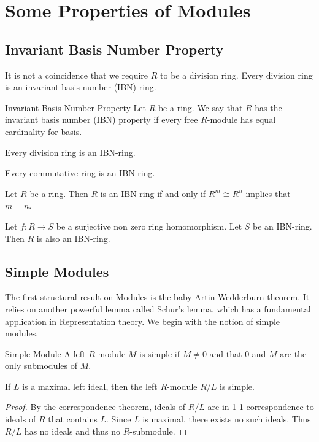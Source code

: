 \documentclass[a4paper]{article}
\begin{document}
\pagebreak
\section{Some Properties of Modules}
\subsection{Invariant Basis Number Property}
It is not a coincidence that we require $R$ to be a division ring. Every division ring is an invariant basis number (IBN) ring. 

\begin{defn}{Invariant Basis Number Property}{} Let $R$ be a ring. We say that $R$ has the invariant basis number (IBN) property if every free $R$-module has equal cardinality for basis. 
\end{defn}

\begin{prp}{}{} Every division ring is an IBN-ring. 
\end{prp}

\begin{prp}{}{} Every commutative ring is an IBN-ring. 
\end{prp}

\begin{prp}{}{} Let $R$ be a ring. Then $R$ is an IBN-ring if and only if $R^m\cong R^n$ implies that $m=n$. 
\end{prp}

\begin{prp}{}{} Let $f:R\to S$ be a surjective non zero ring homomorphism. Let $S$ be an IBN-ring. Then $R$ is also an IBN-ring. 
\end{prp}

\subsection{Simple Modules}
The first structural result on Modules is the baby Artin-Wedderburn theorem. It relies on another powerful lemma called Schur's lemma, which has a fundamental application in Representation theory. We begin with the notion of simple modules. 

\begin{defn}{Simple Module}{} A left $R$-module $M$ is simple if $M\neq 0$ and that $0$ and $M$ are the only submodules of $M$. 
\end{defn}

\begin{lmm}{}{} If $L$ is a maximal left ideal, then the left $R$-module $R/L$ is simple. \tcbline
\begin{proof}
By the correspondence theorem, ideals of $R/L$ are in 1-1 correspondence to ideals of $R$ that contains $L$. Since $L$ is maximal, there exists no such ideals. Thus $R/L$ has no ideals and thus no $R$-submodule. 
\end{proof}
\end{lmm}
\end{document}

